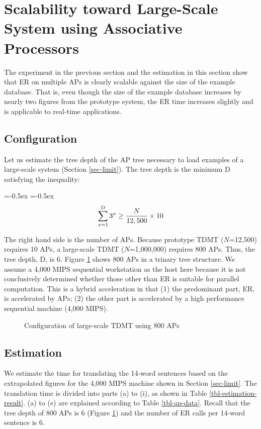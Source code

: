 \section{Scalability toward Large-Scale System using 
Associative Processors}\label{sec-scale}

The experiment in the previous section 
and the estimation in this section
show that ER on multiple APs is clearly scalable against 
 the size of the example database.
That is, 
even though  the size of the example database
increases by nearly two figures from the prototype 
system, the ER time increases slightly
and 
is applicable to real-time applications.

\subsection{Configuration}
Let us estimate the tree depth of the AP tree necessary to load
examples of a large-scale system (Section \ref{sec-limit}).
The tree depth is the minimum D satisfying
the inequality:

{
\abovedisplayskip=-0.5ex
\belowdisplayskip=-0.5ex
\begin{eqnarray}
\sum^{\rm D}_{x=1} 3^x \ge {\frac{N}{12,500}} \times 10
\end{eqnarray}
}

The right hand side is the  number of  APs. 
Because 
prototype TDMT ($N$=12,500) requires 10 APs,
a large-scale TDMT ($N$=1,000,000) requires 800 APs. 
Thus, the tree depth, D, is 6.
Figure \ref{fig-config-scale} shows 800 APs in a trinary tree structure.
We assume a 4,000 MIPS sequential workstation as the host here because
it is not conclusively determined whether those other than ER is
suitable for parallel computation. 
This is a hybrid acceleration in that (1) the predominant part, ER, is 
accelerated by APs; (2) the other part is accelerated by a high performance 
sequential machine (4,000 MIPS).

\begin{figure}[htb]
  \begin{center}
    \caption{Configuration of large-scale TDMT using 800 APs}  
    \label{fig-config-scale}
  \end{center}
\end{figure}

\subsection{Estimation}
We estimate the time for translating
the 14-word  sentences based on the extrapolated 
 figures for the 4,000  MIPS  machine shown in Section \ref{sec-limit}.
 The translation time is divided into parts (a) to (i), as shown in Table
\ref{tbl-estimation-result}.
(a) to (e) are explained according to Table \ref{tbl-ap-data}.
Recall that the tree depth of 800 APs is 6 (Figure \ref{fig-config-scale})
and the number of ER calls per 
14-word sentence is 6.

